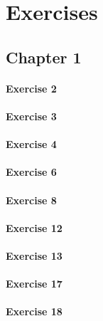 \section{Exercises}
\subsection{Chapter 1}
\paragraph{Exercise 2}
\paragraph{Exercise 3}
\paragraph{Exercise 4}
\paragraph{Exercise 6}
\paragraph{Exercise 8}
\paragraph{Exercise 12}
\paragraph{Exercise 13}
\paragraph{Exercise 17}
\paragraph{Exercise 18}

